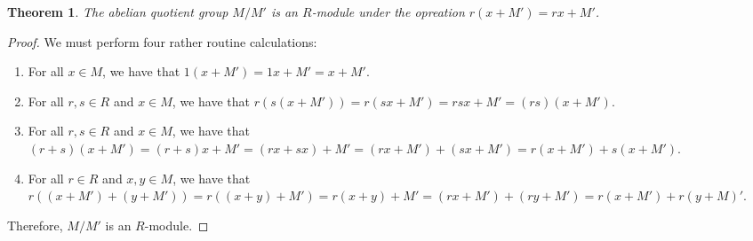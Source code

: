 \documentclass[11pt]{article}
\newtheorem{theorem}{Theorem}
\begin{document}
\begin{adjustwidth}{1cm}{}
	\begin{theorem}
		The abelian quotient group $M / M'$ is an $R$-module under the opreation $r(x + M') = rx + M'$.
	\end{theorem}
	\begin{proof}
		We must perform four rather routine calculations:
		\begin{enumerate}
			\item For all $x \in M$, we have that $1(x + M') = 1x + M' = x + M'$.
			\item For all $r, s \in R$ and $x \in M$, we have that $r(s(x + M')) = r(sx + M') = rsx + M' = (rs)(x + M')$.
			\item For all $r, s \in R$ and $x \in M$, we have that $(r + s)(x + M') = (r + s)x + M' = (rx + sx) + M' = (rx + M') + (sx + M') = r(x + M') + s(x + M')$.
			\item For all $r \in R$ and $x, y \in M$, we have that $r((x + M') + (y + M')) = r((x + y) + M') = r(x + y) + M' = (rx + M') + (ry + M') = r(x + M') + r(y + M)'$.
		\end{enumerate}
		Therefore, $M / M'$ is an $R$-module.
	\end{proof}
\end{adjustwidth}


\end{document}
